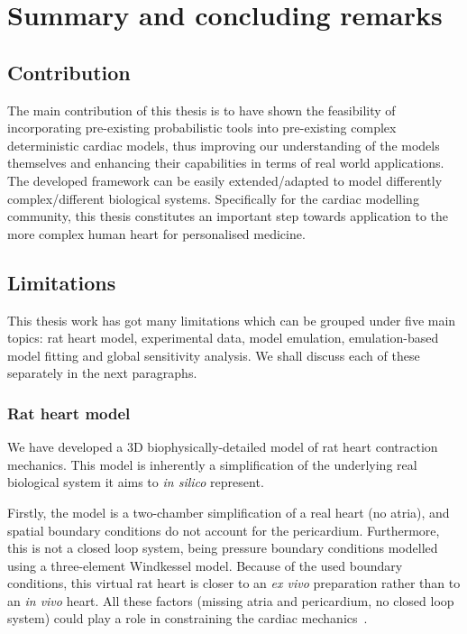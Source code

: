 \chapter{Summary and concluding remarks}\label{cha:chapter9}
%
%
%
\section{Contribution}\label{sec:ch9contribution}
The main contribution of this thesis is to have shown the feasibility of incorporating pre-existing probabilistic tools into pre-existing complex deterministic cardiac models, thus improving our understanding of the models themselves and enhancing their capabilities in terms of real world applications. The developed framework can be easily extended/adapted to model differently complex/different biological systems. Specifically for the cardiac modelling community, this thesis constitutes an important step towards application to the more complex human heart for personalised medicine. 


%
%
%
\section{Limitations}\label{sec:ch9limitations}
This thesis work has got many limitations which can be grouped under five main topics: rat heart model, experimental data, model emulation, emulation-based model fitting and global sensitivity analysis. We shall discuss each of these separately in the next paragraphs.


%
%
%
\subsection{Rat heart model}\label{sec:ch9rat_heart_model}
We have developed a $3$D biophysically-detailed model of rat heart contraction mechanics. This model is inherently a simplification of the underlying real biological system it aims to \textit{in silico} represent.

\vspace{0.2cm}
Firstly, the model is a two-chamber simplification of a real heart (no atria), and spatial boundary conditions do not account for the pericardium. Furthermore, this is not a closed loop system, being pressure boundary conditions modelled using a three-element Windkessel model. Because of the used boundary conditions, this virtual rat heart is closer to an \textit{ex vivo} preparation rather than to an \textit{in vivo} heart. All these factors (missing atria and pericardium, no closed loop system) could play a role in constraining the cardiac mechanics~\cite{Strocchi:2020}.

